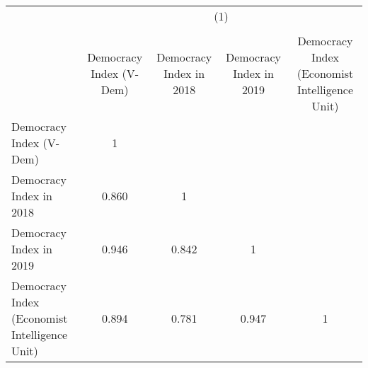 \begin{tabular}{l*{4}{c}}
\hline\hline
                &\multicolumn{4}{c}{(1)}                \\
                &\multicolumn{4}{c}{}                   \\
                &Democracy Index (V-Dem)&Democracy Index in 2018&Democracy Index in 2019&Democracy Index (Economist Intelligence Unit)\\
\hline
Democracy Index (V-Dem)&        1&         &         &         \\
Democracy Index in 2018&    0.860&        1&         &         \\
Democracy Index in 2019&    0.946&    0.842&        1&         \\
Democracy Index (Economist Intelligence Unit)&    0.894&    0.781&    0.947&        1\\
\hline\hline
\end{tabular}
